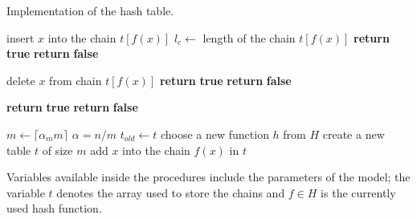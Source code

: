 \begin{algorithm}[ht]
\caption{Implementation of the hash table.}
\label{algorithm-hash-table}
\begin{minipage}[t]{0.5\linewidth}
\begin{algorithmic}
		\State insert $x$ into the chain $t[f(x)]$
		\State $l_c \leftarrow $ length of the chain $t[f(x)]$
			\State {}
		\EndIf
		\State \textbf{return} \textbf{true} 
	\Else
		\State \textbf{return} \textbf{false} 
	\EndIf
\EndProcedure
\end{algorithmic}
\vspace{0.1cm}
\begin{algorithmic}
		\State delete $x$ from chain $t[f(x)]$
			\State {}
		\EndIf
		\State \textbf{return} \textbf{true} 
	\Else
		\State \textbf{return} \textbf{false} 
	\EndIf
\EndProcedure
\end{algorithmic}
\end{minipage}
\hfill
\begin{minipage}[t]{0.49\linewidth}
\begin{algorithmic}
		\State \textbf{return} \textbf{true} 
	\Else
		\State \textbf{return} \textbf{false} 
	\EndIf
\EndProcedure
\end{algorithmic}
\vspace{0.1cm}
\begin{algorithmic}
	\State {}
		\State $m \leftarrow \lceil\alpha_m m\rceil$
		\State $\alpha = n / m$
	\EndIf
	\State $t_{old} \leftarrow t$
	\State choose a new function $h$ from $H$
	\Repeat
	\State create a new table $t$ of size $m$
		\State add $x$ into the chain $f(x)$ in $t$
	\EndFor
\EndProcedure
\end{algorithmic}
\end{minipage}
\begin{minipage}[t]{\linewidth}
\vspace{0.3cm}
Variables available inside the procedures include the parameters of the model; the variable $t$ denotes the array used to store the chains and $f \in H$ is the currently used hash function.
\end{minipage}
\end{algorithm}